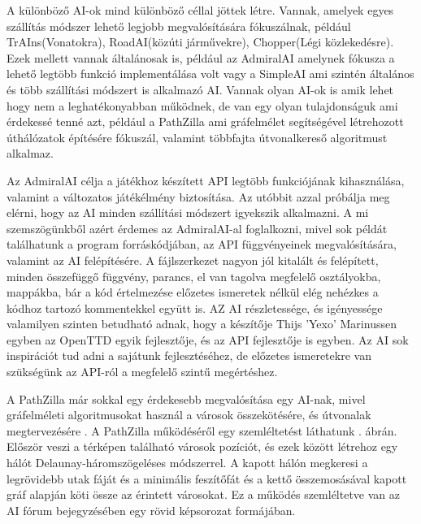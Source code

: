 A különböző AI-ok mind különböző céllal jöttek létre. Vannak, amelyek egyes szállítás módszer lehető legjobb megvalósítására fókuszálnak, például TrAIns(Vonatokra), RoadAI(közúti járművekre), Chopper(Légi közlekedésre). Ezek mellett vannak általánosak is, például az AdmiralAI amelynek fókusza a lehető legtöbb funkció implementálása volt vagy a SimpleAI ami szintén általános és több szállítási módszert is alkalmazó AI. Vannak olyan AI-ok is amik lehet hogy nem a leghatékonyabban működnek, de van egy olyan tulajdonságuk ami érdekessé tenné azt, például a PathZilla ami gráfelmélet segítségével létrehozott úthálózatok építésére fókuszál, valamint többfajta útvonalkereső algoritmust alkalmaz.

Az AdmiralAI célja a játékhoz készített API legtöbb funkciójának kihasználása, valamint a változatos játékélmény biztosítása. Az utóbbit azzal próbálja meg elérni, hogy az AI minden szállítási módszert igyekszik alkalmazni. A mi szemszögünkből azért érdemes az AdmiralAI-al foglalkozni, mivel sok példát találhatunk a program forráskódjában, az API függvényeinek megvalósítására, valamint az AI felépítésére. A fájlszerkezet nagyon jól kitalált és felépített, minden összefüggő függvény, parancs, el van tagolva megfelelő osztályokba, mappákba, bár a kód értelmezése előzetes ismeretek nélkül elég nehézkes a kódhoz tartozó kommentekkel együtt is. AZ AI részletessége, és igényessége valamilyen szinten betudható adnak, hogy a készítője Thijs 'Yexo' Marinussen egyben az OpenTTD egyik fejlesztője, és az API fejlesztője is egyben. Az AI sok inspirációt tud adni a sajátunk fejlesztéséhez, de előzetes ismeretekre van szükségünk az API-ról a megfelelő szintű megértéshez.

A PathZilla már sokkal egy érdekesebb megvalósítása egy AI-nak, mivel gráfelméleti algoritmusokat használ a városok összekötésére, és útvonalak megtervezésére \cite{openttdforum}. A PathZilla működéséről egy szemléltetést láthatunk . ábrán. Először veszi a térképen található városok pozíciót, és ezek között létrehoz egy hálót Delaunay-háromszögeléses módszerrel. A kapott hálón megkeresi a legrövidebb utak fáját és a minimális feszítőfát és a kettő összemosásával kapott gráf alapján köti össze az érintett városokat. Ez a működés szemléltetve van az AI fórum bejegyzésében egy rövid képsorozat formájában.

